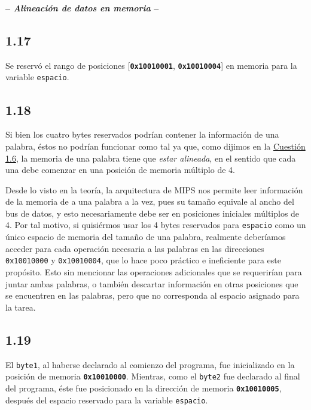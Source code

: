 \documentclass[a4paper]{report}
\begin{document}
\begin{center}
\large\textbf{-- \textsl{Alineación de datos en memoria} --}
\end{center}

\subsection*{1.17}

Se reservó el rango de posiciones [\texttt{\textbf{0x10010001}}, \texttt{\textbf{0x10010004}}] en memoria para la variable \texttt{espacio}.

\subsection*{1.18}
\label{sec:c1-18}

Si bien los cuatro bytes reservados podrían contener la información de una palabra, éstos no podrían funcionar como tal ya que, como dijimos en la \hyperref[sec:c1-6]{Cuestión 1.6}, la memoria de una palabra tiene que \textit{estar alineada}, en el sentido que cada una debe comenzar en una posición de memoria múltiplo de 4.

Desde lo visto en la teoría, la arquitectura de MIPS nos permite leer información de la memoria de a una palabra a la vez, pues su tamaño equivale al ancho del bus de datos, y esto necesariamente debe ser en posiciones iniciales múltiplos de 4. Por tal motivo, si quisiérmos usar los 4 bytes reservados para \texttt{espacio} como un único espacio de memoria del tamaño de una palabra, realmente deberíamos acceder para cada operación necesaria a las palabras en las direcciones \texttt{0x10010000} y \texttt{0x10010004}, que lo hace poco práctico e ineficiente para este propósito. Esto sin mencionar las operaciones adicionales que se requerirían para juntar ambas palabras, o también descartar información en otras posiciones que se encuentren en las palabras, pero que no corresponda al espacio asignado para la tarea.

\subsection*{1.19}

El \texttt{byte1}, al haberse declarado al comienzo del programa, fue inicializado en la posición de memoria \textbf{\texttt{0x10010000}}. Mientras, como el \texttt{byte2} fue declarado al final del programa, éste fue posicionado en la dirección de memoria \textbf{\texttt{0x10010005}}, después del espacio reservado para la variable \texttt{espacio}.
\end{document}
